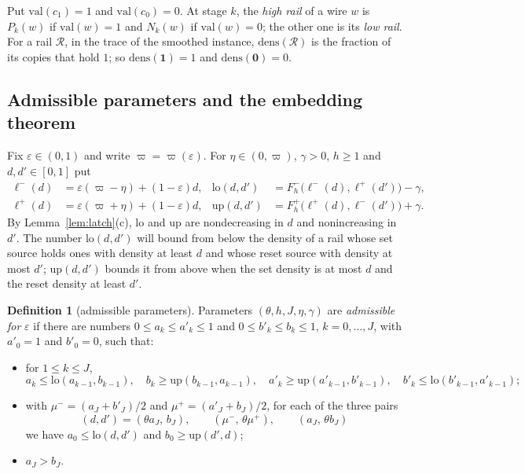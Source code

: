 \documentclass[11pt]{amsart}
\theoremstyle{definition}
\newtheorem{definition}[theorem]{Definition}
\theoremstyle{remark}
\newcommand{\eps}{\varepsilon}
\newcommand{\val}{\mathrm{val}}
\begin{document}
Put $\val(c_1)=1$ and $\val(c_0)=0$. At stage $k$, the \emph{high rail} of a wire $w$ is $P_k(w)$
if $\val(w)=1$ and $N_k(w)$ if $\val(w)=0$; the other one is its \emph{low rail}. For a rail
$\mathcal R$, in the trace of the smoothed instance, $\mathrm{dens}(\mathcal R)$ is the fraction of
its copies that hold $1$; so $\mathrm{dens}(\mathbf 1)=1$ and $\mathrm{dens}(\mathbf 0)=0$.

\subsection{Admissible parameters and the embedding theorem}

Fix $\eps\in(0,1)$ and write $\varpi=\varpi(\eps)$. For $\eta\in(0,\varpi)$, $\gamma>0$, $h\ge1$ and
$d,d'\in[0,1]$ put
\begin{align*}
\ell^-(d)&=\eps(\varpi-\eta)+(1-\eps)d, & \mathrm{lo}(d,d')&=F^-_h\bigl(\ell^-(d),\ell^+(d')\bigr)-\gamma,\\
\ell^+(d)&=\eps(\varpi+\eta)+(1-\eps)d, & \mathrm{up}(d,d')&=F^+_h\bigl(\ell^+(d),\ell^-(d')\bigr)+\gamma .
\end{align*}
By Lemma~\ref{lem:latch}(c), $\mathrm{lo}$ and $\mathrm{up}$ are nondecreasing in $d$ and
nonincreasing in $d'$. The number $\mathrm{lo}(d,d')$ will bound from below the density of a rail
whose set source holds ones with density at least $d$ and whose reset source with density at most
$d'$; $\mathrm{up}(d,d')$ bounds it from above when the set density is at most $d$ and the reset
density at least $d'$.

\begin{definition}[admissible parameters]\label{def:adm}
Parameters $(\theta,h,J,\eta,\gamma)$ are \emph{admissible for} $\eps$ if there are numbers
$0\le a_k\le a'_k\le1$ and $0\le b'_k\le b_k\le1$, $k=0,\dots,J$, with $a'_0=1$ and $b'_0=0$, such
that:
\begin{itemize}[leftmargin=3em]
\item[(R)] for $1\le k\le J$,
\[
a_k\le\mathrm{lo}(a_{k-1},b_{k-1}),\quad b_k\ge\mathrm{up}(b_{k-1},a_{k-1}),\quad
a'_k\ge\mathrm{up}(a'_{k-1},b'_{k-1}),\quad b'_k\le\mathrm{lo}(b'_{k-1},a'_{k-1});
\]
\item[(G)] with $\mu^-=(a_J+b'_J)/2$ and $\mu^+=(a'_J+b_J)/2$, for each of the three pairs
\[
(d,d')=(\theta a_J,\,b_J),\qquad(\mu^-,\,\theta\mu^+),\qquad(a_J,\,\theta b_J)
\]
we have $a_0\le\mathrm{lo}(d,d')$ and $b_0\ge\mathrm{up}(d',d)$;
\item[(V)] $a_J>b_J$.
\end{itemize}
\end{definition}
\end{document}
